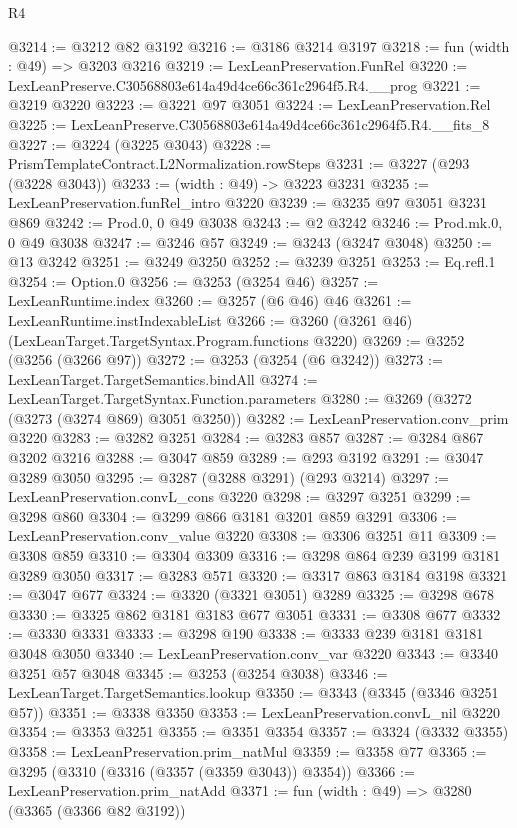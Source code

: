 \begin{lexlean}{R4}
\begin{coremodule}
@3214 := @3212 @82 @3192
@3216 := @3186 @3214 @3197
@3218 := fun (width : @49) => @3203 @3216
@3219 := LexLeanPreservation.FunRel
@3220 := LexLeanPreserve.C30568803e614a49d4ce66c361c2964f5.R4.__prog
@3221 := @3219 @3220
@3223 := @3221 @97 @3051
@3224 := LexLeanPreservation.Rel
@3225 := LexLeanPreserve.C30568803e614a49d4ce66c361c2964f5.R4.__fits_8
@3227 := @3224 (@3225 @3043)
@3228 := PrismTemplateContract.L2Normalization.rowSteps
@3231 := @3227 (@293 (@3228 @3043))
@3233 := (width : @49) -> @3223 @3231
@3235 := LexLeanPreservation.funRel_intro @3220
@3239 := @3235 @97 @3051 @3231 @869
@3242 := Prod.{0, 0} @49 @3038
@3243 := @2 @3242
@3246 := Prod.mk.{0, 0} @49 @3038
@3247 := @3246 @57
@3249 := @3243 (@3247 @3048)
@3250 := @13 @3242
@3251 := @3249 @3250
@3252 := @3239 @3251
@3253 := Eq.refl.{1}
@3254 := Option.{0}
@3256 := @3253 (@3254 @46)
@3257 := LexLeanRuntime.index
@3260 := @3257 (@6 @46) @46
@3261 := LexLeanRuntime.instIndexableList
@3266 := @3260 (@3261 @46) (LexLeanTarget.TargetSyntax.Program.functions @3220)
@3269 := @3252 (@3256 (@3266 @97))
@3272 := @3253 (@3254 (@6 @3242))
@3273 := LexLeanTarget.TargetSemantics.bindAll
@3274 := LexLeanTarget.TargetSyntax.Function.parameters
@3280 := @3269 (@3272 (@3273 (@3274 @869) @3051 @3250))
@3282 := LexLeanPreservation.conv_prim @3220
@3283 := @3282 @3251
@3284 := @3283 @857
@3287 := @3284 @867 @3202 @3216
@3288 := @3047 @859
@3289 := @293 @3192
@3291 := @3047 @3289 @3050
@3295 := @3287 (@3288 @3291) (@293 @3214)
@3297 := LexLeanPreservation.convL_cons @3220
@3298 := @3297 @3251
@3299 := @3298 @860
@3304 := @3299 @866 @3181 @3201 @859 @3291
@3306 := LexLeanPreservation.conv_value @3220
@3308 := @3306 @3251 @11
@3309 := @3308 @859
@3310 := @3304 @3309
@3316 := @3298 @864 @239 @3199 @3181 @3289 @3050
@3317 := @3283 @571
@3320 := @3317 @863 @3184 @3198
@3321 := @3047 @677
@3324 := @3320 (@3321 @3051) @3289
@3325 := @3298 @678
@3330 := @3325 @862 @3181 @3183 @677 @3051
@3331 := @3308 @677
@3332 := @3330 @3331
@3333 := @3298 @190
@3338 := @3333 @239 @3181 @3181 @3048 @3050
@3340 := LexLeanPreservation.conv_var @3220
@3343 := @3340 @3251 @57 @3048
@3345 := @3253 (@3254 @3038)
@3346 := LexLeanTarget.TargetSemantics.lookup
@3350 := @3343 (@3345 (@3346 @3251 @57))
@3351 := @3338 @3350
@3353 := LexLeanPreservation.convL_nil @3220
@3354 := @3353 @3251
@3355 := @3351 @3354
@3357 := @3324 (@3332 @3355)
@3358 := LexLeanPreservation.prim_natMul
@3359 := @3358 @77
@3365 := @3295 (@3310 (@3316 (@3357 (@3359 @3043)) @3354))
@3366 := LexLeanPreservation.prim_natAdd
@3371 := fun (width : @49) => @3280 (@3365 (@3366 @82 @3192))

\end{coremodule}
\end{lexlean}
